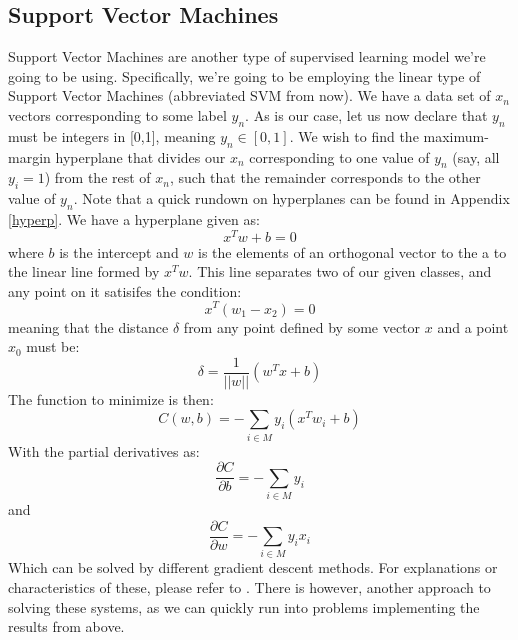 \documentclass{article}
\begin{document}
\subsection{Support Vector Machines}
Support Vector Machines are another type of supervised learning model we're going to be using. Specifically, we're going to be employing the linear type of Support Vector Machines (abbreviated SVM from now). \newline
We have a data set of $x_n$ vectors corresponding to some label $y_n$. As is our case, let us now declare that $y_n$ must be integers in [0,1], meaning $y_n \in [0,1]$. 
\newline 
We wish to find the maximum-margin hyperplane that divides our $x_n$ corresponding to one value of $y_n$ (say, all $y_i = 1$) from the rest of $x_n$, such that the remainder corresponds to the other value of $y_n$. Note that a quick rundown on hyperplanes can be found in Appendix \ref{hyperp}. \newline
We have a hyperplane given as:
\begin{equation*}
    x^T w + b = 0
\end{equation*}
where $b$ is the intercept and $w$ is the elements of an orthogonal vector to the a to the linear line formed by $x^T w$. \newline
This line separates two of our given classes, and any point on it satisifes the condition:
\begin{equation*}
    x^T(w_1 - x_2) = 0
\end{equation*}
meaning that the distance $\delta$ from any point defined by some vector $x$ and a point $x_0$ must be:
\begin{equation*}
    \delta = \frac{1}{||w||}(w^T x + b)
\end{equation*}
The function to minimize is then:
\begin{equation*}
    C(w, b) = -\sum_{i\in M} y_i (x^Tw_i + b)
\end{equation*}
With the partial derivatives as:
\begin{equation*}
    \frac{\partial C}{\partial b} = -\sum_{i\in M} y_i
\end{equation*}
and
\begin{equation*}
    \frac{\partial C}{\partial w} = -\sum_{i \in M} y_i x_i 
\end{equation*}
Which can be solved by different gradient descent methods. For explanations or characteristics of these, please refer to \cite{proj2}.
\newline
There is however, another approach to solving these systems, as we can quickly run into problems implementing the results from above. 
\end{document}
